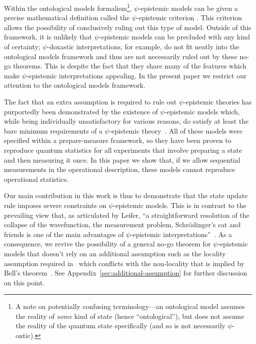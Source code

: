 \documentclass[%
 reprint, onecolumn, 12pt,
superscriptaddress,
nofootinbib,
 prx, 
]{quantumarticle}
\begin{document}
 
Within the ontological models formalism\footnote{A note on potentially
  confusing terminology---an ontological model assumes the reality of
  \emph{some} kind of state (hence ``ontological''), but does not
  assume the reality of the quantum state specifically (and so is not
  necessarily $\psi$-ontic).}, $\psi$-epistemic models can be given a
precise mathematical definition called the $\psi$-epistemic criterion
\cite{Spekkensdefenseepistemicview2007}. This criterion allows the
possibility of conclusively ruling out this type of model. Outside of
this framework, it is unlikely that $\psi$-epistemic models can be
precluded with any kind of certainty; $\psi$-doxastic interpretations,
for example, do not fit neatly into the ontological models framework
and thus are not necessarily ruled out by these no-go theorems. This
is despite the fact that they share many of the features which make
$\psi$-epistemic interpretations appealing. In the present paper we
restrict our attention to the ontological models framework.


 
The fact that an extra assumption is required to rule out
$\psi$-epistemic theories has purportedly been demonstrated by the
existence of $\psi$-epistemic models which, while being individually
unsatisfactory for various reasons, do satisfy at least the bare
minimum requirements of a $\psi$-epistemic
theory~\cite{LewisDistinctQuantumStates2012,Aaronsonpsepistemictheoriesrole2013,HarriganRepresentingprobabilisticdata2007}. All
of these models were specified within a prepare-measure framework, so
they have been proven to reproduce quantum statistics for all
experiments that involve preparing a state and then measuring it
once. In this paper we show that, if we allow sequential measurements
in the operational description, these models cannot reproduce
operational statistics.

Our main contribution in this work is thus to demonstrate that the
state update rule imposes severe constraints on $\psi$-epistemic
models. This is in contrast to the prevailing view that, as
articulated by Leifer, ``a straightforward resolution of the collapse
of the wavefunction, the measurement problem, Schr\"odinger’s cat and
friends is one of the main advantages of $\psi$-epistemic
interpretations''~\cite{Leiferquantumstatereal2014}. As a consequence,
we revive the possibility of a general no-go theorem for
$\psi$-epistemic models that doesn't rely on an additional assumption
such as the locality assumption required
in~\cite{Puseyrealityquantumstate2012} which conflicts with the
non-locality that is implied by Bell's
theorem~\cite{Emersonwholegreatersum2013,MansfieldRealityquantumstate2016}. See
Appendix~\ref{sec:additional-assumption} for further discussion on
this point.
\end{document}
